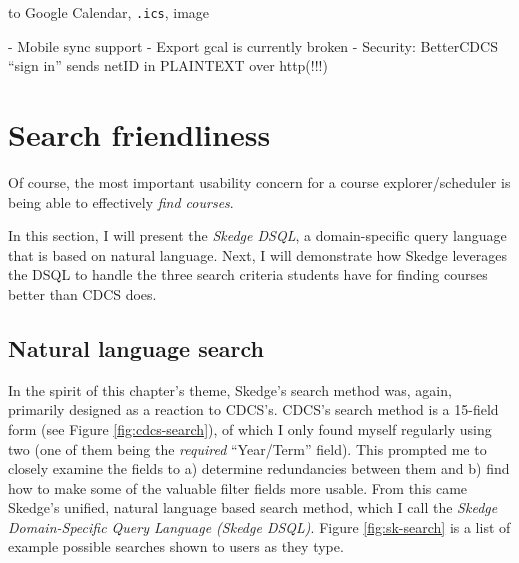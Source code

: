 to Google Calendar, {\tt .ics}, image

- Mobile sync support
- Export gcal is currently broken
- Security: BetterCDCS ``sign in'' sends netID in PLAINTEXT over http(!!!)

\section{Search friendliness}

Of course, the most important usability concern for a course explorer/scheduler is being able to effectively \emph{find courses}.

In this section, I will present the \emph{Skedge DSQL}, a domain-specific query language that is based on natural language. Next, I will demonstrate how Skedge leverages the DSQL to handle the three search criteria students have for finding courses better than CDCS does.

\subsection{Natural language search}

In the spirit of this chapter's theme, Skedge's search method was, again, primarily designed as a reaction to CDCS's. CDCS's search method is a 15-field form (see Figure \ref{fig:cdcs-search}), of which I only found myself regularly using two (one of them being the \emph{required} ``Year/Term'' field). This prompted me to closely examine the fields to a) determine redundancies between them and b) find how to make some of the valuable filter fields more usable. From this came Skedge's unified, natural language based search method, which I call the \emph{Skedge Domain-Specific Query Language (Skedge DSQL)}. Figure \ref{fig:sk-search} is a list of example possible searches shown to users as they type.

